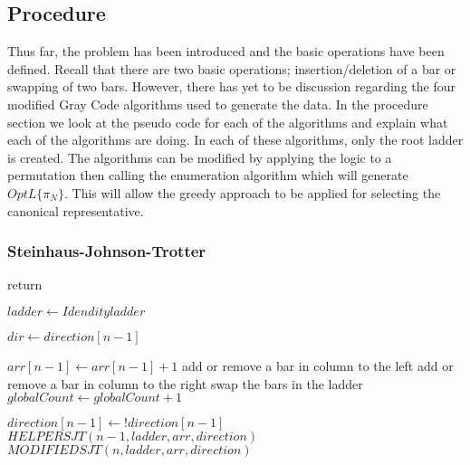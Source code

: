 \subsection{Procedure}
Thus far, the problem has been introduced and the basic 
operations have been defined. Recall that there are two basic 
operations; insertion/deletion of a bar or swapping of two bars.
However, there has yet to be discussion regarding the four modified 
Gray Code algorithms used to generate the data. In the procedure section 
we look at the pseudo code for each of the algorithms and explain what 
each of the algorithms are doing. In each of these algorithms, only the root 
ladder is created. The algorithms can be modified by applying  the logic to 
a permutation then calling the enumeration algorithm which will generate $OptL\{\pi_{N}\}$.
This will allow the greedy approach to be applied for selecting the canonical representative.


\subsubsection{Steinhaus-Johnson-Trotter}\pagebreak


\begin{algorithm}
  \begin{algorithmic}[1]

        \State return
      \EndIf

        \State $ladder \gets Idendity ladder$
      \EndIf

     
      \State $dir \gets direction[n-1]$

        
        \State $arr[n-1] \gets arr[n-1]+1$
          \State add or remove a bar in column to the left
          \Else
            \State add or remove a bar in column to the right
        \EndIf
          \State swap the bars in the ladder
         \EndIf
        \State $globalCount \gets globalCount+1$

      \EndFor
      \State $direction[n-1] \gets !direction[n-1]$
      \State $HELPERSJT(n-1, ladder, arr, direction)$
      \State $MODIFIEDSJT(n,  ladder, arr, direction)$

    \EndFunction
  \end{algorithmic}
\end{algorithm}

